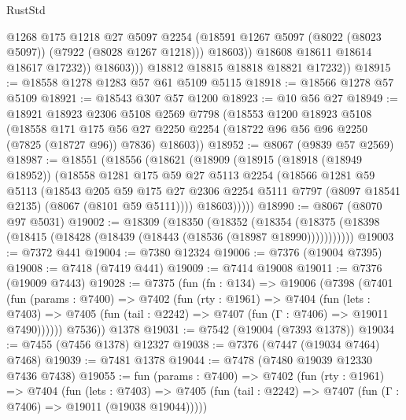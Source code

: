 \begin{lexlean}{RustStd}
\begin{coremodule}
                      @1268
                      @175
                      @1218
                      @27
                      @5097
                      @2254
                      (@18591 @1267 @5097 (@8022 (@8023 @5097)) (@7922 (@8028 @1267 @1218)))
                      @18603))
                  @18608
                  @18611
                  @18614
                  @18617
                  @17232))
              @18603)))
        @18812
        @18815
        @18818
        @18821
        @17232))
@18915 := @18558 @1278 @1283 @57 @61 @5109 @5115
@18918 := @18566 @1278 @57 @5109
@18921 := @18543 @307 @57 @1200
@18923 := @10 @56 @27
@18949 := @18921
    @18923
    @2306
    @5108
    @2569
    @7798
    (@18553
      @1200
      @18923
      @5108
      (@18558
        @171
        @175
        @56
        @27
        @2250
        @2254
        (@18722 @96 @56 @96 @2250 (@7825 (@18727 @96)) @7836)
        @18603))
@18952 := @8067 (@9839 @57 @2569)
@18987 := @18551
    (@18556
      (@18621
        (@18909
          (@18915
            (@18918 (@18949 @18952))
            (@18558
              @1281
              @175
              @59
              @27
              @5113
              @2254
              (@18566
                @1281
                @59
                @5113
                (@18543
                  @205
                  @59
                  @175
                  @27
                  @2306
                  @2254
                  @5111
                  @7797
                  (@8097 @18541 @2135)
                  (@8067 (@8101 @59 @5111))))
              @18603)))))
@18990 := @8067 (@8070 @97 @5031)
@19002 := @18309
    (@18350
      (@18352
        (@18354 (@18375 (@18398 (@18415 (@18428 (@18439 (@18443 (@18536 (@18987 @18990)))))))))))
@19003 := @7372 @441
@19004 := @7380 @12324
@19006 := @7376 (@19004 @7395)
@19008 := @7418 (@7419 @441)
@19009 := @7414 @19008
@19011 := @7376 (@19009 @7443)
@19028 := @7375
    (fun (fn : @134) =>
    @19006
      (@7398
        (@7401
          (fun (params : @7400) =>
          @7402
            (fun (rty : @1961) =>
            @7404
              (fun (lets : @7403) =>
              @7405 (fun (tail : @2242) => @7407 (fun (Γ : @7406) => @19011 @7490))))))
        @7536))
    @1378
@19031 := @7542 (@19004 (@7393 @1378))
@19034 := @7455 (@7456 @1378) @12327
@19038 := @7376 (@7447 (@19034 @7464) @7468)
@19039 := @7481 @1378
@19044 := @7478 (@7480 @19039 @12330 @7436 @7438)
@19055 := fun (params : @7400) =>
  @7402
    (fun (rty : @1961) =>
    @7404
      (fun (lets : @7403) =>
      @7405 (fun (tail : @2242) => @7407 (fun (Γ : @7406) => @19011 (@19038 @19044)))))

\end{coremodule}
\end{lexlean}
